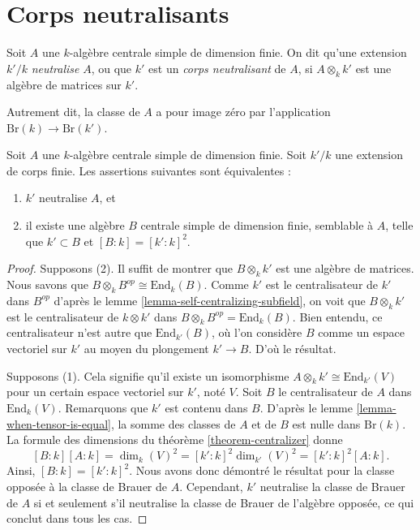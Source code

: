 \section{Corps neutralisants}
\label{section-splitting}


\begin{definition}
\label{definition-splitting}
Soit $A$ une $k$-algèbre centrale simple de dimension finie.
On dit qu'une extension $k'/k$ {\it neutralise} $A$, ou que
$k'$ est un {\it corps neutralisant} de $A$, si $A \otimes_k k'$ est
une algèbre de matrices sur $k'$.
\end{definition}

\noindent
Autrement dit, la classe de $A$ a pour image zéro
par l'application $\text{Br}(k) \to \text{Br}(k')$.

\begin{theorem}
\label{theorem-splitting}
Soit $A$ une $k$-algèbre centrale simple de dimension finie.
Soit $k'/k$ une extension de corps finie.
Les assertions suivantes sont équivalentes :
\begin{enumerate}
\item $k'$ neutralise $A$, et
\item il existe une algèbre $B$ centrale simple de dimension finie, semblable à $A$,
telle que $k' \subset B$ et $[B : k] = [k' : k]^2$.
\end{enumerate}
\end{theorem}

\begin{proof}
Supposons (2). Il suffit de montrer que $B \otimes_k k'$ est une algèbre de
matrices. Nous savons que $B \otimes_k B^{op} \cong \text{End}_k(B)$.
Comme $k'$ est le centralisateur de $k'$ dans $B^{op}$ d'après le
lemme \ref{lemma-self-centralizing-subfield},
on voit que $B \otimes_k k'$ est le centralisateur de $k \otimes k'$
dans $B \otimes_k B^{op} = \text{End}_k(B)$. Bien entendu, ce centralisateur
n'est autre que $\text{End}_{k'}(B)$, où l'on considère $B$ comme un espace vectoriel sur $k'$
au moyen du plongement $k' \to B$. D'où le résultat.

\medskip\noindent
Supposons (1). Cela signifie qu'il existe un isomorphisme
$A \otimes_k k' \cong \text{End}_{k'}(V)$ pour un certain espace vectoriel sur $k'$, noté $V$.
Soit $B$ le centralisateur de $A$ dans $\text{End}_k(V)$. Remarquons que
$k'$ est contenu dans $B$. D'après le
lemme \ref{lemma-when-tensor-is-equal},
la somme des classes de $A$ et de $B$ est nulle dans $\text{Br}(k)$.
La formule des dimensions du
théorème \ref{theorem-centralizer}
donne
$$
[B : k] [A : k] =
\dim_k(V)^2 =
[k' : k]^2 \dim_{k'}(V)^2 =
[k' : k]^2 [A : k].
$$
Ainsi, $[B : k] = [k' : k]^2$. Nous avons donc démontré le résultat pour la
classe opposée à la classe de Brauer de $A$. Cependant, $k'$ neutralise la classe de Brauer
de $A$ si et seulement s'il neutralise
la classe de Brauer de l'algèbre opposée, ce qui conclut dans tous les cas.
\end{proof}

